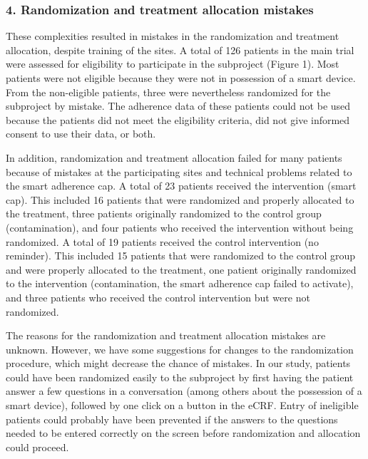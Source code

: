 \documentclass{article}
\begin{document}
\subsubsection{4. Randomization and treatment allocation mistakes}

These complexities resulted in mistakes in the randomization and treatment allocation, despite training of the sites. A total of 126 patients in the main trial were assessed for eligibility to participate in the subproject (Figure 1). Most patients were not eligible because they were not in possession of a smart device. From the non-eligible patients, three were nevertheless randomized for the subproject by mistake. The adherence data of these patients could not be used because the patients did not meet the eligibility criteria, did not give informed consent to use their data, or both.



In addition, randomization and treatment allocation failed for many patients because of mistakes at the participating sites and technical problems related to the smart adherence cap. A total of 23 patients received the intervention (smart cap). This included 16 patients that were randomized and properly allocated to the treatment, three patients originally randomized to the control group (contamination), and four patients who received the intervention without being randomized. A total of 19 patients received the control intervention (no reminder). This included 15 patients that were randomized to the control group and were properly allocated to the treatment, one patient originally randomized to the intervention (contamination, the smart adherence cap failed to activate), and three patients who received the control intervention but were not randomized. 



The reasons for the randomization and treatment allocation mistakes are unknown. However, we have some suggestions for changes to the randomization procedure, which might decrease the chance of mistakes. In our study, patients could have been randomized easily to the subproject by first having the patient answer a few questions in a conversation (among others about the possession of a smart device), followed by one click on a button in the eCRF. Entry of ineligible patients could probably have been prevented if the answers to the questions needed to be entered correctly on the screen before randomization and allocation could proceed.
\end{document}
